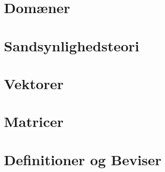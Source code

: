 



\chapter{Domæner}


\chapter{Sandsynlighedsteori}


\chapter{Vektorer}


\chapter{Matricer}


\chapter{Definitioner og Beviser}




